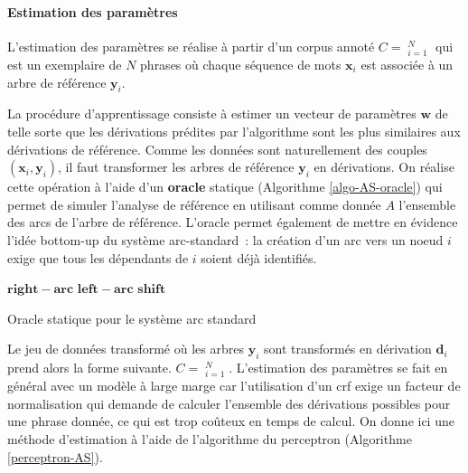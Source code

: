 \documentclass[11pt,openany]{book}
\begin{document}
\paragraph{Estimation des paramètres}
L'estimation des paramètres se réalise à partir d'un 
corpus annoté $C = \mathop{(\mathbf{x}_i,\mathbf{y}_i)}^N_{i=1}$ qui est un
exemplaire de $N$ phrases où chaque séquence de mots $\mathbf{x}_i$
est associée à un arbre de référence $\mathbf{y}_i$.

La procédure d'apprentissage consiste à estimer un vecteur de
paramètres $\mathbf{w}$ de telle sorte que les dérivations prédites par
l'algorithme sont les plus similaires aux dérivations de référence.
Comme les données sont naturellement des couples
$(\mathbf{x}_i,\mathbf{y}_i)$, il faut transformer les arbres de
référence $\mathbf{y}_i$ en dérivations.
On réalise cette opération à l'aide d'un {\bf oracle} statique
(Algorithme \ref{algo-AS-oracle}) qui permet de simuler l'analyse de référence en utilisant
comme donnée $A$ l'ensemble des arcs de l'arbre de référence. L'oracle
permet également de mettre en évidence l'idée bottom-up du système arc-standard~: la
création d'un arc vers un noeud $i$ exige que tous les dépendants 
de $i$ soient déjà identifiés.

\begin{algorithm}
\scriptsize
\begin{algorithmic}[0]
 
\State \Return $\mathbf{right-arc}$
\State \Return $\mathbf{left-arc}$
\EndIf
\EndIf
{} 
\State\Return $\mathbf{shift}$
\EndIf
\EndFunction
\end{algorithmic}
\caption{\label{algo-AS-oracle} Oracle statique pour le système arc
  standard}
\end{algorithm}
Le jeu de données transformé où les arbres $\mathbf{y}_i$ sont
transformés en dérivation $\mathbf{d}_i$ prend alors la forme suivante.
$C = \mathop{(\mathbf{x}_i,\mathbf{d}_i)}^N_{i=1}$. L'estimation des
paramètres se fait en général avec un modèle à large marge car
l'utilisation d'un {\sc crf} exige un facteur de
normalisation qui demande de calculer l'ensemble des dérivations
possibles pour une phrase donnée, ce qui est trop coûteux en temps de calcul.
On donne ici une méthode d'estimation à l'aide de l'algorithme du
perceptron (Algorithme \ref{perceptron-AS}).
\end{document}

